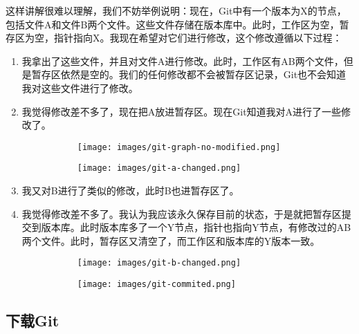 \documentclass[../main.tex]{subfiles}
\begin{document}
这样讲解很难以理解，我们不妨举例说明：现在，Git中有一个版本为X的节点，包括文件A和文件B两个文件。这些文件存储在版本库中。此时，工作区为空，暂存区为空，指针指向X。我现在希望对它们进行修改，这个修改遵循以下过程：

\begin{enumerate}
  \item 我拿出了这些文件，并且对文件A进行修改。此时，工作区有AB两个文件，但是暂存区依然是空的。我们的任何修改都不会被暂存区记录，Git也不会知道我对这些文件进行了修改。

  \item 我觉得修改差不多了，现在把A放进暂存区。现在Git知道我对A进行了一些修改了。
    \begin{figure}[!ht]
      \begin{subfigure}[t]{0.45\linewidth}
        \centering
        \texttt{[image: images/git-graph-no-modified.png]}
      \end{subfigure}
      \hfill               %
      \begin{subfigure}[t]{0.45\linewidth}
        \centering
        \texttt{[image: images/git-a-changed.png]}
      \end{subfigure}
    \end{figure}
  \item 我又对B进行了类似的修改，此时B也进暂存区了。
  \item 我觉得修改差不多了。我认为我应该永久保存目前的状态，于是就把暂存区提交到版本库。此时版本库多了一个Y节点，指针也指向Y节点，有修改过的AB两个文件。此时，暂存区又清空了，而工作区和版本库的Y版本一致。
    \begin{figure}[!ht]
      \begin{subfigure}[t]{0.45\linewidth}
        \centering
        \texttt{[image: images/git-b-changed.png]}
      \end{subfigure}
      \hfill               %
      \begin{subfigure}[t]{0.45\linewidth}
        \centering
        \texttt{[image: images/git-commited.png]}
      \end{subfigure}
    \end{figure}
\end{enumerate}

\subsection{下载Git}
\end{document}

